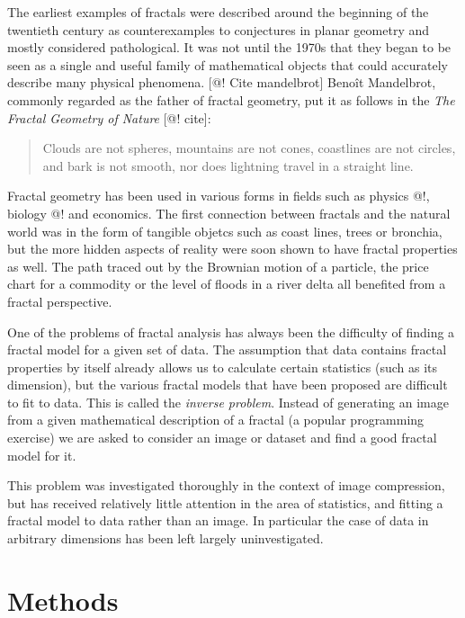 \documentclass[11pt, twocolumn]{article}
\theoremstyle{definition}
\begin{document}
The earliest examples of fractals were described around the beginning of the twentieth century as counterexamples to conjectures in planar geometry and mostly considered pathological. It was not until the 1970s that they began to be seen as a single and useful family of mathematical objects that could accurately describe many physical phenomena. [@! Cite mandelbrot] Beno\^it Mandelbrot, commonly regarded as the father of fractal geometry, put it as follows in the \emph{The Fractal Geometry of Nature} [@! cite]:

\begin{quotation}
\small
\noindent Clouds are not spheres, mountains are not cones, coastlines are not circles, and bark is not smooth, nor does lightning travel in a straight line.
\end{quotation}

Fractal geometry has been used in various forms in fields such as physics @!, biology @! and economics. The first connection between fractals and the natural world was in the form of tangible objetcs such as coast lines, trees or bronchia, but the more hidden aspects of reality were soon shown to have fractal properties as well. The path traced out by the Brownian motion of a particle, the price chart for a commodity or the level of floods in a river delta all benefited from a fractal perspective.

One of the problems of fractal analysis has always been the difficulty of finding a fractal model for a given set of data. The assumption that data contains fractal properties by itself already allows us to calculate certain statistics (such as its dimension), but the various fractal models that have been proposed are difficult to fit to data. This is called the \emph{inverse problem}. Instead of generating an image from a given mathematical description of a fractal (a popular programming exercise) we are asked to consider an image or dataset and find a good fractal model for it.

This problem was investigated thoroughly in the context of image compression, but has received relatively little attention in the area of statistics, and fitting a fractal model to data rather than an image. In particular the case of data in arbitrary dimensions has been left largely uninvestigated.

\section{Methods}
\end{document}
